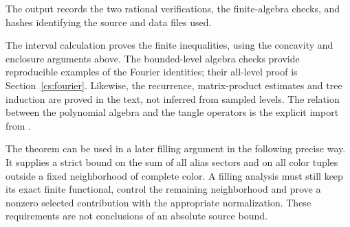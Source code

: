 The output records the two rational verifications, the finite-algebra
checks, and hashes identifying the source and data files used.

The interval calculation proves the finite inequalities, using the
concavity and enclosure arguments above. The bounded-level algebra
checks provide reproducible examples of the Fourier identities; their
all-level proof is Section~\ref{cs:fourier}. Likewise, the recurrence,
matrix-product estimates and tree induction are proved in the text,
not inferred from sampled levels. The relation between the polynomial
algebra and the tangle operators is the explicit import from \cite{Newton}.

The theorem can be used in a later filling argument in the following precise way. It supplies a strict bound on the sum of all alias sectors and on all color tuples outside a fixed neighborhood of complete color. A filling analysis must still keep its exact finite functional, control the remaining neighborhood and prove a nonzero selected contribution with the appropriate normalization. These requirements are not conclusions of an absolute source bound.

